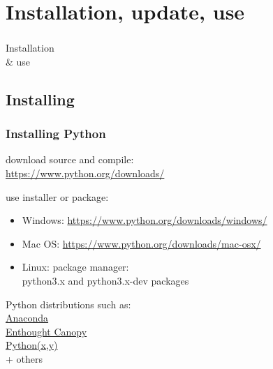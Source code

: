 \section{Installation, update, use}

{
\begin{frame}
\frametitle{}
{\fontsize{50}{60}\selectfont Installation\\
 \& use} 

\end{frame}
}


\subsection{Installing}

\begin{frame}
\frametitle{Installing Python}

\begin{description}

\item<1->[Hard way:] download source and compile:\\
\url{https://www.python.org/downloads/}

\item<2->[Normal way:] use installer or package:

\begin{itemize}
\item Windows: \url{https://www.python.org/downloads/windows/}
\item Mac OS: \url{https://www.python.org/downloads/mac-osx/}
\item Linux: package manager:\\
python3.x and python3.x-dev packages
\end{itemize}

\item<3->[Easy way:] Python distributions such as:\\
\href{https://www.anaconda.com/distribution/}{Anaconda} \\
\href{https://assets.enthought.com/downloads/}{Enthought Canopy} \\
\href{http://python-xy.github.io/}{Python(x,y)} \\
+ others

\end{description}

\end{frame}

